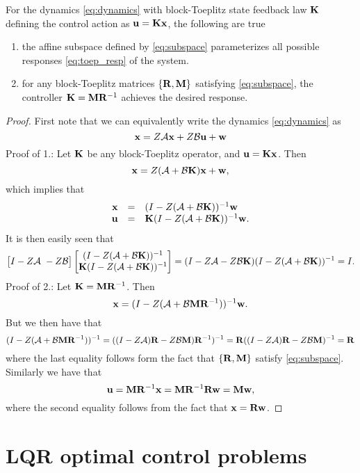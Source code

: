 \documentclass[11pt]{article}
\numberwithin{equation}{section}
\begin{document}
\begin{theorem}
For the dynamics \eqref{eq:dynamics} with block-Toeplitz state feedback law $\mathbf{K}$ defining the control action as $\mathbf{u} = \mathbf{K} \mathbf{x}$, the following are true
\begin{enumerate}
\item the affine subspace defined by \eqref{eq:subspace} parameterizes all possible responses \eqref{eq:toep_resp} of the system.
\item for any block-Toeplitz matrices $\{\mathbf{R}, \mathbf{M}\}$ satisfying \eqref{eq:subspace}, the controller $\mathbf{K} = \mathbf{M} \mathbf{R}^{-1}$ achieves the desired response.
\end{enumerate}
\label{thm:param}
\end{theorem}
\begin{proof}
First note that we can equivalently write the dynamics \eqref{eq:dynamics} as
\begin{equation}
\mathbf{x} = Z\mathcal{A} \mathbf{x}+ Z\mathcal{B} \mathbf{u} + \mathbf{w}
\end{equation}
Proof of 1.: Let $\mathbf{K}$ be any block-Toeplitz operator, and $\mathbf{u} = \mathbf{K} \mathbf{x}$.  Then
\begin{equation}
\mathbf{x} = Z(\mathcal{A}+\mathcal{B}\mathbf{K})\mathbf{x} + \mathbf{w},
\end{equation}
which implies that
\begin{equation}
\begin{array}{rcl}
\mathbf{x} &=& (I-Z(\mathcal{A}+\mathcal{B}\mathbf{K}))^{-1}\mathbf{w} \\
\mathbf{u} &=& \mathbf{K}(I-Z(\mathcal{A}+\mathcal{B}\mathbf{K}))^{-1}\mathbf{w}.
\end{array}
\end{equation}
It is then easily seen that
\begin{equation}
\begin{bmatrix} I - Z\A \ -Z\B\end{bmatrix}\begin{bmatrix}(I-Z(\A+\B\tf K))^{-1} \\ \tf K (I-Z(\A+\B\tf K))^{-1} \end{bmatrix} = (I - Z\A -Z\B\tf K)(I-Z(\A+\B\tf K))^{-1} = I.
\end{equation}
Proof of 2.: Let $\mathbf{K} = \mathbf{M} \mathbf{R}^{-1}$.  Then
\begin{equation}
\mathbf{x} = (I-Z(\mathcal{A}+\mathcal{B}\mathbf{M} \mathbf{R}^{-1}))^{-1}\mathbf{w}.
\end{equation}
But we then have that
\begin{equation}
(I-Z(\mathcal{A}+\mathcal{B}\mathbf{M} \mathbf{R}^{-1}))^{-1} = ((I-Z\mathcal{A})\mathbf{R} - Z\mathcal{B} \mathbf{M})\mathbf{R}^{-1})^{-1} = \mathbf{R} ((I-Z\mathcal{A})\mathbf{R} - Z\mathcal{B} \mathbf{M})^{-1}  = \mathbf{R}
\end{equation}
where the last equality follows form the fact that $\{\mathbf{R}, \mathbf{M}\}$ satisfy \eqref{eq:subspace}.  Similarly we have that
\begin{equation}
\mathbf{u} = \mathbf{M} \mathbf{R}^{-1}\mathbf{x} = \mathbf{M} \mathbf{R}^{-1} \mathbf{R} \mathbf{w} = \mathbf{M} \mathbf{w},
\end{equation}
where the second equality follows from the fact that $\mathbf{x} = \mathbf{R} \mathbf{w}$.
\end{proof}

\section{LQR optimal control problems}
\end{document}
